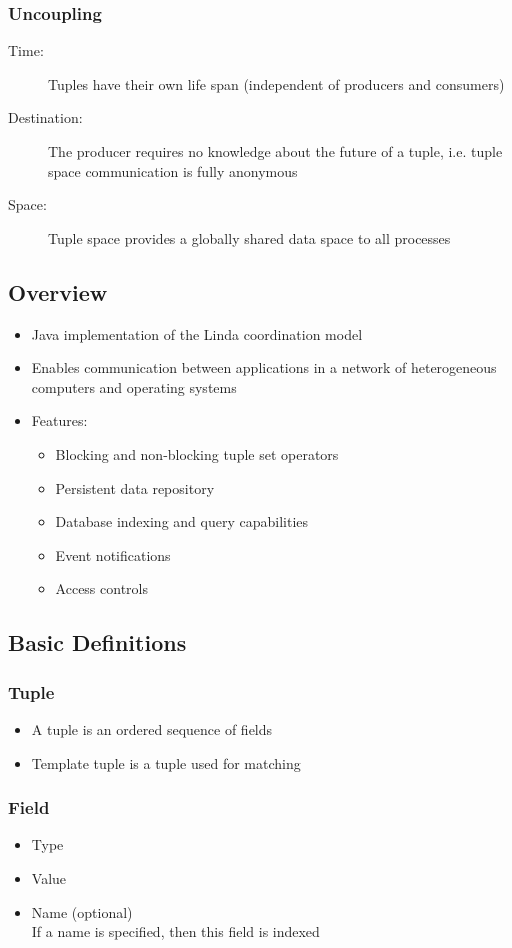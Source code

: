 \documentclass[10pt]{article}
\begin{document}
\subsubsection{Uncoupling}
\begin{description}
	\item[Time:] Tuples have their own life span (independent of producers and consumers)
	\item[Destination:] The producer requires no knowledge about the future of a tuple, i.e. tuple space communication is fully anonymous
	\item[Space:] Tuple space provides a globally shared data space to all processes
\end{description}
\subsection{Overview}
\begin{itemize}
	\item Java implementation of the Linda coordination model
	\item Enables communication between applications in a network of heterogeneous computers and operating systems
	\item Features:
		\begin{itemize}
			\item Blocking and non-blocking tuple set operators
			\item Persistent data repository
			\item Database indexing and query capabilities
			\item Event notifications
			\item Access controls
		\end{itemize}
\end{itemize}
\subsection{Basic Definitions}
\subsubsection{Tuple	}
\begin{itemize}
	\item A tuple is an ordered sequence of fields
	\item Template tuple is a tuple used for matching
\end{itemize}
\subsubsection{Field}
\begin{itemize}
	\item Type	
	\item Value
	\item Name (optional) \\
		If a name is specified, then this field is indexed
\end{itemize}
\end{document}
